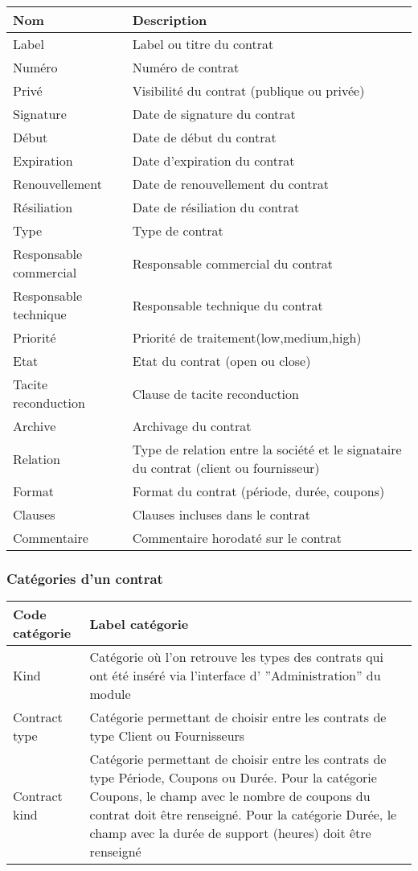 \begin{tabular}{|p{3cm}|p{10cm}|}
\hline
\textbf{Nom} & \textbf{Description} \\
\hline
Label & Label ou titre du contrat\\
\hline
Numéro & Numéro de contrat\\ 
\hline
Privé & Visibilité du contrat (publique ou privée)\\
\hline
Signature & Date de signature du contrat\\
\hline
Début & Date de début du contrat \\
\hline
Expiration & Date d'expiration du contrat \\
\hline
Renouvellement & Date de renouvellement du contrat \\
\hline
Résiliation & Date de résiliation du contrat \\
\hline
Type & Type de contrat \\
\hline
Responsable commercial &  Responsable commercial du contrat\\
\hline
Responsable technique & Responsable technique du contrat\\
\hline
Priorité &  Priorité de traitement(low,medium,high)\\
\hline
Etat & Etat du contrat (open ou close) \\
\hline
Tacite reconduction &  Clause de tacite reconduction\\
\hline
Archive &  Archivage du contrat\\
\hline
Relation &  Type de relation entre la société et le signataire du contrat (client ou fournisseur)\\
\hline
Format & Format du contrat (période, durée, coupons)\\
\hline
Clauses & Clauses incluses dans le contrat\\
\hline
Commentaire & Commentaire horodaté sur le contrat\\
\hline
\end{tabular}
\vspace{0.3cm}


\subsubsection{Catégories d'un contrat}

\begin{tabular}{|p{3cm}|p{10cm}|}
\hline\textbf{Code catégorie} & \textbf{Label catégorie} \\
\hline
Kind & Catégorie où l'on retrouve les types des contrats qui ont été inséré via l'interface d' ''Administration'' du module\\
\hline
Contract type & Catégorie permettant de choisir entre les contrats de type Client ou Fournisseurs \\
\hline
Contract kind & Catégorie permettant de choisir entre les contrats de type Période, Coupons ou Durée.
 Pour la catégorie Coupons, le champ avec le nombre de coupons du contrat doit être renseigné.
 Pour la catégorie Durée, le champ avec la durée de support (heures) doit être renseigné \\
\hline
\end{tabular}


